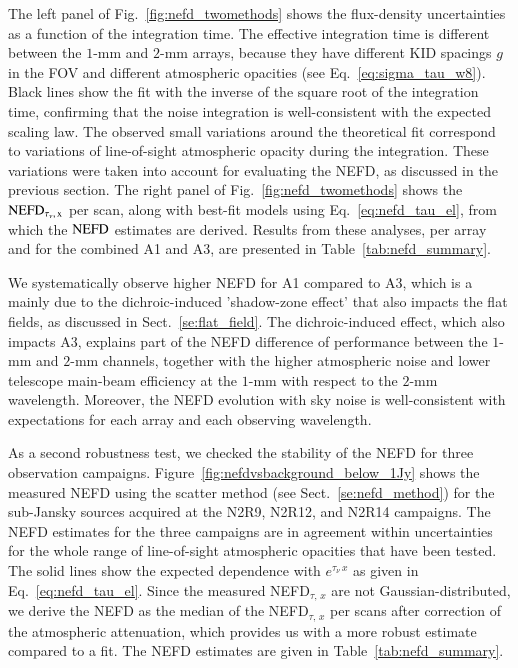 \documentclass[traditionalabstract]{aa}
\newcommand{\taunu}{\tau_{\nu}}
\begin{document}
{The left panel of Fig.~\ref{fig:nefd_twomethods} shows the flux-density
uncertainties as a function of the integration time. The effective
integration time is different between the $1$-mm and $2$-mm arrays,
because they have different KID spacings $g$ in the FOV and different
atmospheric opacities (see Eq.~\ref{eq:sigma_tau_w8}). Black lines show
the fit with the inverse of the square root of the integration time,
confirming that the noise integration is well-consistent with the expected
scaling law. The observed small variations around the theoretical fit
correspond to variations of line-of-sight atmospheric opacity during the
integration. These variations were taken into account for evaluating the NEFD, as
discussed in the previous section. The right panel of
Fig.~\ref{fig:nefd_twomethods} shows the
$\rm{NEFD}_{\taunu,\, x}$ per scan, along with best-fit models using
Eq.~\ref{eq:nefd_tau_el}, from which the $\rm{NEFD}$ estimates are derived. 
Results from these analyses, per array and for the
combined A1 and A3, are presented in Table~\ref{tab:nefd_summary}.

We systematically observe higher NEFD for A1 compared to A3, which is a mainly
due to the dichroic-induced 'shadow-zone effect' that also impacts the flat fields,
as discussed in Sect.~\ref{se:flat_field}.  The dichroic-induced effect, which
also impacts A3, explains part of the NEFD difference of performance between the $1$-mm
and $2$-mm channels, together with the higher atmospheric noise and lower
telescope main-beam efficiency at the $1$-mm with respect to the $2$-mm
wavelength. Moreover, the NEFD evolution with sky noise is well-consistent with expectations for each array and each observing wavelength.

As a second robustness test, we checked the stability of the NEFD for
three observation campaigns. Figure~\ref{fig:nefdvsbackground_below_1Jy} shows the
measured NEFD using the scatter method (see Sect.~\ref{se:nefd_method}) for the
sub-Jansky sources acquired at the N2R9, N2R12, and N2R14
campaigns. The NEFD estimates for the
three campaigns are in agreement within uncertainties for the whole
range of line-of-sight atmospheric opacities that have been tested.
The solid lines show the expected dependence with
$e^{\taunu\,x}$ as given in Eq.~\ref{eq:nefd_tau_el}. %
Since the measured NEFD$_{\tau,\, x}$ are not Gaussian-distributed, we
derive the NEFD as the median of the NEFD$_{\tau,\, x}$
per scans after correction of the atmospheric attenuation, which provides us
with a more robust estimate compared to a fit. The NEFD estimates
are given in Table~\ref{tab:nefd_summary}.

}
\end{document}
